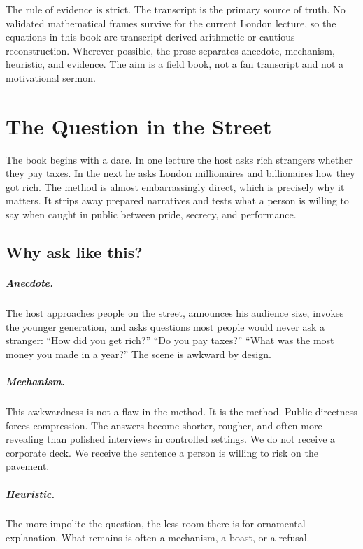 \documentclass[11pt,oneside]{book}
\begin{document}
The rule of evidence is strict. The transcript is the primary source of truth. No validated mathematical frames survive for the current London lecture, so the equations in this book are transcript-derived arithmetic or cautious reconstruction. Wherever possible, the prose separates anecdote, mechanism, heuristic, and evidence. The aim is a field book, not a fan transcript and not a motivational sermon.

\tableofcontents

\mainmatter

\chapter{The Question in the Street}

The book begins with a dare. In one lecture the host asks rich strangers whether they pay taxes. In the next he asks London millionaires and billionaires how they got rich. The method is almost embarrassingly direct, which is precisely why it matters. It strips away prepared narratives and tests what a person is willing to say when caught in public between pride, secrecy, and performance.

\section{Why ask like this?}

\paragraph{Anecdote.} The host approaches people on the street, announces his audience size, invokes the younger generation, and asks questions most people would never ask a stranger: ``How did you get rich?'' ``Do you pay taxes?'' ``What was the most money you made in a year?'' The scene is awkward by design.

\paragraph{Mechanism.} This awkwardness is not a flaw in the method. It is the method. Public directness forces compression. The answers become shorter, rougher, and often more revealing than polished interviews in controlled settings. We do not receive a corporate deck. We receive the sentence a person is willing to risk on the pavement.

\paragraph{Heuristic.} The more impolite the question, the less room there is for ornamental explanation. What remains is often a mechanism, a boast, or a refusal.
\end{document}
